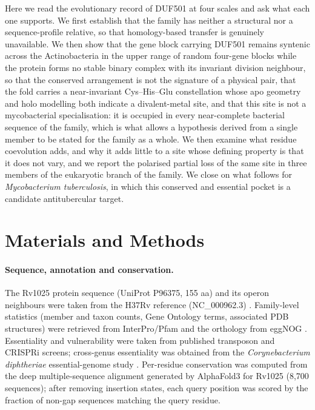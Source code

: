 \documentclass[11pt,a4paper]{article}
\newcommand{\mtb}{\textit{Mycobacterium tuberculosis}}
\begin{document}
Here we read the evolutionary record of DUF501 at four scales and ask what each one supports. We first establish that the family has neither a structural nor a sequence-profile relative, so that homology-based transfer is genuinely unavailable. We then show that the gene block carrying DUF501 remains syntenic across the Actinobacteria in the upper range of random four-gene blocks while the protein forms no stable binary complex with its invariant division neighbour, so that the conserved arrangement is not the signature of a physical pair, that the fold carries a near-invariant Cys--His--Glu constellation whose apo geometry and holo modelling both indicate a divalent-metal site, and that this site is not a mycobacterial specialisation: it is occupied in every near-complete bacterial sequence of the family, which is what allows a hypothesis derived from a single member to be stated for the family as a whole. We then examine what residue coevolution adds, and why it adds little to a site whose defining property is that it does not vary, and we report the polarised partial loss of the same site in three members of the eukaryotic branch of the family. We close on what follows for \mtb{}, in which this conserved and essential pocket is a candidate antitubercular target.

\section{Materials and Methods}

\paragraph{Sequence, annotation and conservation.} The Rv1025 protein sequence (UniProt P96375, 155 aa) and its operon neighbours were taken from the H37Rv reference (NC\_000962.3) \citep{cole1998genome}. Family-level statistics (member and taxon counts, Gene Ontology terms, associated PDB structures) were retrieved from InterPro/Pfam \citep{paysanlafosse2023interpro} and the orthology from eggNOG \citep{huertacepas2019eggnog}. Essentiality and vulnerability were taken from published transposon \citep{dejesus2017essentiality} and CRISPRi \citep{bosch2021vulnerability} screens; cross-genus essentiality was obtained from the \textit{Corynebacterium diphtheriae} essential-genome study \citep{goodall2023diphtheriae}. Per-residue conservation was computed from the deep multiple-sequence alignment generated by AlphaFold3 for Rv1025 (8{,}700 sequences); after removing insertion states, each query position was scored by the fraction of non-gap sequences matching the query residue.
\end{document}
